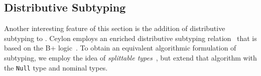 \begin{comment}
In particular,
We have to allow intersection type to be
supertype of nominal types in the context $[[PG]]$
to support diamond inheritance.
Metatheory of the calculus will change accordingly.
\end{comment}



\subsection{Distributive Subtyping}
Another interesting feature of this section is the addition of
distributive subtyping to \name. Ceylon employs an enriched
distributive subtyping relation~\citep{muehlboeck2018empowering} that
is based on the B+ logic~\citep{routley1972semantics,van2000minimal}.
To obtain an equivalent algorithmic formulation of subtyping,
we employ the idea of \emph{splittable types}~\citep{huang2021distributing}, but extend that algorithm
with the \lstinline{Null} type and nominal types.


